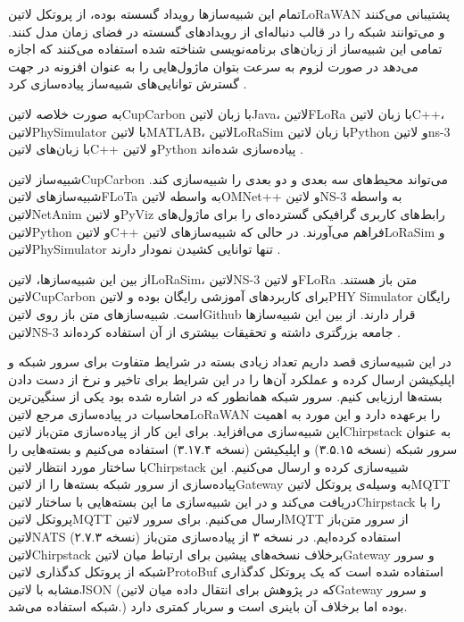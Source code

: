 تمام این شبیه‌سازها رویداد گسسته بوده، از پروتکل ‌لاتین{LoRaWAN} پشتیبانی می‌کنند و می‌توانند شبکه را در قالب
دنباله‌ای از رویدادهای گسسته در فضای زمان مدل کنند.
تمامی این شبیه‌ساز از زبان‌های برنامه‌نویسی شناخته شده استفاده می‌کنند که اجازه می‌دهد در صورت لزوم به سرعت بتوان
ماژول‌هایی را به عنوان افزونه در جهت گسترش توانایی‌های شبیه‌ساز پیاده‌سازی کرد
.

به صورت خلاصه ‌لاتین{CupCarbon} با زبان ‌لاتین{Java}، ‌لاتین{FLoRa} با زبان ‌لاتین{C++}،
‌لاتین{PhySimulator} با ‌لاتین{MATLAB}، ‌لاتین{LoRaSim} با زبان ‌لاتین{Python}
و ‌لاتین{ns-3} با زبان‌های ‌لاتین{C++} و ‌لاتین{Python} پیاده‌سازی شده‌اند
.

شبیه‌ساز ‌لاتین{CupCarbon} می‌تواند محیط‌های سه بعدی و دو بعدی را شبیه‌سازی کند.
شبیه‌سازهای ‌لاتین{FLoTa} به واسطه ‌لاتین{OMNet++} و ‌لاتین{NS-3} به واسطه
‌لاتین{NetAnim} و ‌لاتین{PyViz} رابط‌های کاربری گرافیکی گسترده‌ای را برای ماژول‌های ‌لاتین{Python}
و ‌لاتین{C++} فراهم می‌آورند.
در حالی که شبیه‌سازهای ‌لاتین{LoRaSim} و ‌لاتین{PhySimulator} تنها توانایی کشیدن نمودار دارند
.

از بین این شبیه‌سازها، ‌لاتین{LoRaSim}، ‌لاتین{NS-3} و ‌لاتین{FLoRa} متن باز هستند.
‌لاتین{CupCarbon} برای کاربردهای آموزشی رایگان بوده و ‌لاتین{PHY Simulator} رایگان است.
شبیه‌سازهای متن‌ باز روی ‌لاتین{Github} قرار دارند. از بین این شبیه‌سازها ‌لاتین{NS-3}
جامعه بزرگتری داشته و تحقیقات بیشتری از آن استفاده کرده‌اند
.


در این شبیه‌سازی قصد داریم تعداد زیادی بسته در شرایط متفاوت برای سرور شبکه و اپلیکیشن ارسال کرده و عملکرد آن‌ها را در این شرایط برای تاخیر و نرخ از دست دادن بسته‌ها ارزیابی کنیم.
سرور شبکه همانطور که در  اشاره شده بود یکی از سنگین‌ترین محاسبات در پیاده‌سازی مرجع ‌لاتین{LoRaWAN} را برعهده دارد و این مورد به
اهمیت این شبیه‌سازی می‌افزاید.
برای این کار از پیاده‌سازی متن‌باز ‌لاتین{Chirpstack} به عنوان سرور شبکه (نسخه ۳.۵.۱۵) و اپلیکیشن (نسخه ۳.۱۷.۴) استفاده می‌کنیم و بسته‌هایی را با ساختار مورد انتظار
‌لاتین{Chirpstack} شبیه‌سازی کرده و ارسال می‌کنیم.
این پیاده‌سازی از سرور شبکه بسته‌ها را از ‌لاتین{Gateway} به وسیله‌ی پروتکل ‌لاتین{MQTT} دریافت می‌کند و در این شبیه‌سازی ما این بسته‌هایی با ساختار ‌لاتین{Chirpstack}
را با پروتکل ‌لاتین{MQTT} ارسال می‌کنیم. برای سرور ‌لاتین{MQTT} از سرور متن‌باز ‌لاتین{NATS} (نسخه ۲.۷.۳) استفاده کرده‌ایم.
در نسخه ۳ از پیاده‌سازی متن‌باز ‌لاتین{Chirpstack} برخلاف نسخه‌های پیشین برای ارتباط میان ‌لاتین{Gateway} و سرور شبکه از پروتکل کدگذاری ‌لاتین{ProtoBuf} استفاده شده است که یک پروتکل
کدگذاری مشابه با ‌لاتین{JSON} (که در پژوهش  برای انتقال داده میان ‌لاتین{Gateway} و سرور شبکه استفاده می‌شد.) بوده اما برخلاف آن باینری است و سربار کمتری دارد.

